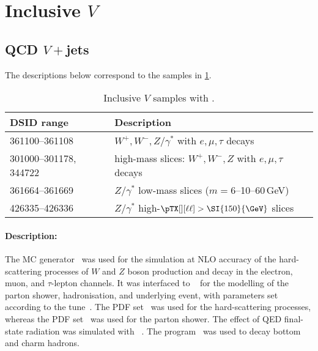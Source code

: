 \section[Inclusive Powheg \(V\)]{Inclusive \POWHEG \(V\)}

\subsection{QCD \(V+\)jets}

The descriptions below correspond to the samples in \cref{tab:v-powheg}.

\begin{table}[!htbp]
  \caption{Inclusive \(V\) samples with \POWHEG.}%
  \label{tab:v-powheg}
  \centering
  \begin{tabular}{l l}
    \toprule
    DSID range & Description \\
    \midrule
    361100--361108    & \(W^+,W^-,Z/\gamma^\ast\) with \(e,\mu,\tau\) decays\\
    301000--301178, 344722    & high-mass slices: \(W^+,W^-,Z\) with \(e,\mu,\tau\) decays \\
    361664--361669 & \(Z/\gamma^\ast\) low-mass slices (\(m=6\)--10--60\,\si{\GeV})\\
    426335--426336 & \(Z/\gamma^\ast\) high-\(\pTX[][\ell\ell] > \SI{150}{\GeV}\) slices \\
    \bottomrule
  \end{tabular}
\end{table}

\paragraph{Description:}

The \POWHEGBOX[v1] MC generator~\cite{Nason:2004rx,Frixione:2007vw,Alioli:2010xd,Alioli:2008gx}
was used for the simulation at NLO accuracy of the hard-scattering processes of \(W\)
and \(Z\) boson production and decay in the electron, muon, and \(\tau\)-lepton
channels. It was interfaced to \PYTHIA[8.186]~\cite{Sjostrand:2007gs}
for the modelling of the parton shower, hadronisation, and underlying
event, with parameters set according to the \AZNLO
tune~\cite{STDM-2012-23}. The \CT[10nlo] PDF set~\cite{Lai:2010vv} was used
for the hard-scattering processes, whereas the \CTEQ[6L1] PDF
set~\cite{Pumplin:2002vw} was used for the parton shower. The effect of
QED final-state radiation was simulated with \PHOTOSpp[3.52]~\cite{Golonka:2005pn,Davidson:2010ew}.
The \EVTGEN[1.2.0] program~\cite{Lange:2001uf} was used to decay bottom and charm hadrons.

